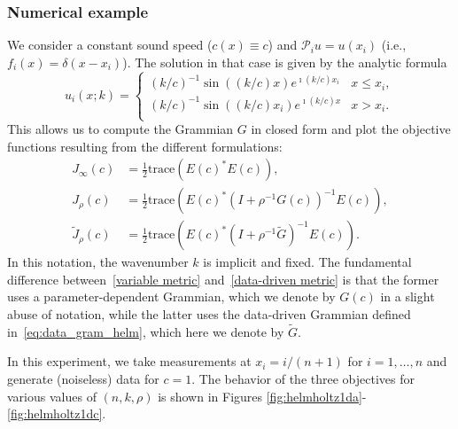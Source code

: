 \documentclass[12pt]{amsart}
\begin{document}
\subsubsection{Numerical example}
We consider a constant sound speed ($c(x)\equiv c$) and $\mathcal{P}_iu = u(x_i)$ (i.e., $f_i(x) = \delta(x-x_i)$). The solution in that case is given by the analytic formula 
\[
u_i(x; k) = 
\begin{cases} 
(k/c)^{-1}\sin((k/c) x)e^{\imath (k/c) x_i}
& x \leq x_i, \\
(k/c)^{-1}\sin((k/c) x_i)e^{\imath (k/c) x}
& x > x_i. \\
\end{cases} 
\]
This allows us to compute the Grammian $G$ in closed form and plot the objective functions resulting from the different formulations:
\begin{align}
J_\infty(c) &= {\textstyle\frac{1}{2}}\text{trace}\left(E(c)^*E(c)\right),\label{conventional}\\
J_\rho(c) &= {\textstyle\frac{1}{2}}\text{trace}\left(E(c)^*\left(I + \rho^{-1}G(c)\right)^{-1}E(c)\right),\label{variable metric}\\
\widetilde{J}_\rho(c) &= {\textstyle\frac{1}{2}}\text{trace}\left(E(c)^*\left(I + \rho^{-1}\widetilde{G}\right)^{-1}E(c)\right).\label{data-driven metric}
\end{align}
In this notation, the wavenumber $k$ is implicit and fixed. The fundamental difference between~\eqref{variable metric} and~\eqref{data-driven metric} is that the former uses a parameter-dependent Grammian, which we denote by $G(c)$ in a slight abuse of notation, while the latter uses the data-driven Grammian defined in~\eqref{eq:data_gram_helm}, which here we denote by $\widetilde{G}$. 

In this experiment, we take measurements at $x_i = i / (n+1)$ for $i = 1, \ldots, n$ and generate (noiseless) data for $c = 1$. The behavior of the three objectives for various values of $(n, k, \rho)$ is shown in Figures \ref{fig:helmholtz1da}-\ref{fig:helmholtz1dc}.
\end{document}
